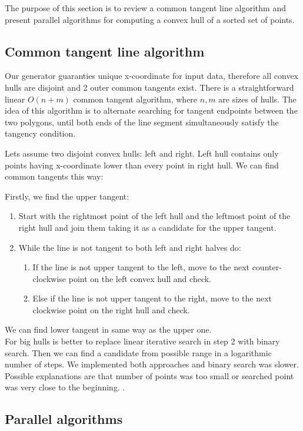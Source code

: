 \documentclass[letterpaper]{article}
\theoremstyle{definition}
\begin{document}
The purpose of this section is to review a common tangent line algorithm and present parallel algorithms for computing a convex hull of a sorted set of points.

\subsection{Common tangent line algorithm}

Our generator guaranties unique x-coordinate for input data, therefore all convex hulls are disjoint and 2 outer common tangents exist. There is a straightforward linear $O(n+m)$ common tangent algorithm, where $n,m$ are sizes of hulls. The idea of this algorithm is to alternate searching for tangent endpoints between the two polygons, until both ends of the line segment simultaneously satisfy the tangency condition. 

Lets assume two disjoint convex hulls: left and right. Left hull contains only points having x-coordinate lower than every point in right hull. We can find common tangents this way:
 
Firstly, we find the upper tangent:
	\begin{enumerate}
		\item Start with the rightmost point of the left hull and the leftmost point of the right hull and join them taking it as a candidate for the upper tangent.
		\item While the line is not tangent to both left and right halves do:
		\begin{enumerate}
			\item If the line is not upper tangent to the left, move to the next counter-clockwise point on the left convex hull and check.
			\item Else if the line is not upper tangent to the right, move to the next clockwise point on the right hull and check.
		\end{enumerate}
	\end{enumerate}
	 We can find lower tangent in same way as the upper one.\\ 

For big hulls is better to replace linear iterative search in step 2 with binary search. Then we can find a candidate from possible range in a logarithmic number of steps.       
We implemented both approaches and binary search was slower. Possible explanations are that number of points was too small or searched point was very close to the beginning.  . 

\subsection{Parallel algorithms}
\end{document}
